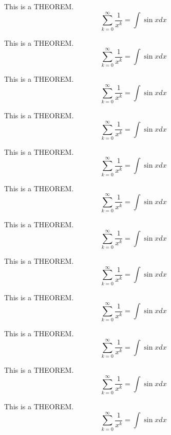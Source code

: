 \documentclass[twoside]{fduthesis-en}
\begin{document}
\begin{fdub}
This is a THEOREM.
\[ \sum_{k=0}^{\infty} \frac{1}{x^k} = \int \sin x dx \]
\end{fdub}

\begin{mb}
This is a THEOREM.
\[ \sum_{k=0}^{\infty} \frac{1}{x^k} = \int \sin x dx \]
\end{mb}

\begin{cb}
This is a THEOREM.
\[ \sum_{k=0}^{\infty} \frac{1}{x^k} = \int \sin x dx \]
\end{cb}


\begin{np}
This is a THEOREM.
\[ \sum_{k=0}^{\infty} \frac{1}{x^k} = \int \sin x dx \]
\end{np}

\begin{nmm}
This is a THEOREM.
\[ \sum_{k=0}^{\infty} \frac{1}{x^k} = \int \sin x dx \]
\end{nmm}

\begin{nfduc}
This is a THEOREM.
\[ \sum_{k=0}^{\infty} \frac{1}{x^k} = \int \sin x dx \]
\end{nfduc}

\begin{nfdub}
This is a THEOREM.
\[ \sum_{k=0}^{\infty} \frac{1}{x^k} = \int \sin x dx \]
\end{nfdub}

\begin{nmb}
This is a THEOREM.
\[ \sum_{k=0}^{\infty} \frac{1}{x^k} = \int \sin x dx \]
\end{nmb}

\begin{ncb}
This is a THEOREM.
\[ \sum_{k=0}^{\infty} \frac{1}{x^k} = \int \sin x dx \]
\end{ncb}

\begin{ncb}
This is a THEOREM.
\[ \sum_{k=0}^{\infty} \frac{1}{x^k} = \int \sin x dx \]
\end{ncb}

\begin{ncb}
This is a THEOREM.
\[ \sum_{k=0}^{\infty} \frac{1}{x^k} = \int \sin x dx \]
\end{ncb}

\begin{ncb}
This is a THEOREM.
\[ \sum_{k=0}^{\infty} \frac{1}{x^k} = \int \sin x dx \]
\end{ncb}
\end{document}
